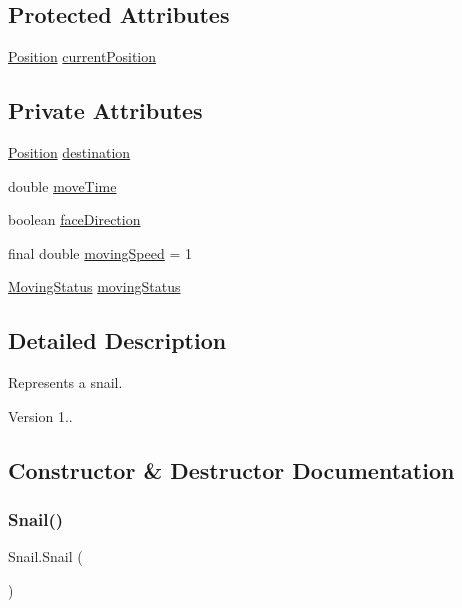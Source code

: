 \subsection*{Protected Attributes}
\begin{DoxyCompactItemize}
\item 
\mbox{\hyperlink{class_position}{Position}} \mbox{\hyperlink{class_snail_a546a453e906d3fc883d3ce5d2aa44915}{current\+Position}}
\end{DoxyCompactItemize}
\subsection*{Private Attributes}
\begin{DoxyCompactItemize}
\item 
\mbox{\hyperlink{class_position}{Position}} \mbox{\hyperlink{class_snail_a93d9364d2800a8ad4ca04e0a4646e3d6}{destination}}
\item 
double \mbox{\hyperlink{class_snail_a4d00c96144349b1f5e42c32cdd47d254}{move\+Time}}
\item 
boolean \mbox{\hyperlink{class_snail_a76d36543b0b95a0e09f1f923d2835d7e}{face\+Direction}}
\item 
final double \mbox{\hyperlink{class_snail_a1d4e4fdcaa64b8ed111cdaf5536be80f}{moving\+Speed}} = 1
\item 
\mbox{\hyperlink{enum_moving_object_1_1_moving_status}{Moving\+Status}} \mbox{\hyperlink{class_snail_ac89d7ec73d68b4c98583d1eaca4038e9}{moving\+Status}}
\end{DoxyCompactItemize}


\subsection{Detailed Description}
Represents a snail. \begin{DoxyVersion}{Version}
1.. 
\end{DoxyVersion}


\subsection{Constructor \& Destructor Documentation}
\mbox{\label{class_snail_ad38cb99dcf99a4da1651050c10cb26e1}} 
\subsubsection{\texorpdfstring{Snail()}{Snail()}\hspace{0.1cm}{\footnotesize\ttfamily [1/2]}}
{\footnotesize\ttfamily Snail.\+Snail (\begin{DoxyParamCaption}{ }\end{DoxyParamCaption})\hspace{0.3cm}{\ttfamily [inline]}}

